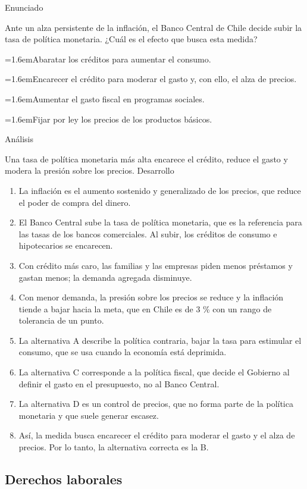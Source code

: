 \documentclass[10pt,a4paper,twocolumn]{article}
\newcommand{\alternativa}[2]{\par\noindent\hangindent=1.6em\hangafter=1\makebox[1.6em][l]{\tecla{#1}}#2\par}
\newcommand{\clave}[1]{\par\smallskip{\sffamily\footnotesize\color{esmeralda} Clave \teclaok{#1}}\par}
\begin{document}
\begin{ejemplo}
{\sffamily\footnotesize\color{zinc500} Enunciado}\par
Ante un alza persistente de la inflación, el Banco Central de Chile decide subir la tasa de política monetaria. ¿Cuál es el efecto que busca esta medida?
\alternativa{A}{Abaratar los créditos para aumentar el consumo.}
\alternativa{B}{Encarecer el crédito para moderar el gasto y, con ello, el alza de precios.}
\alternativa{C}{Aumentar el gasto fiscal en programas sociales.}
\alternativa{D}{Fijar por ley los precios de los productos básicos.}
\clave{B}
{\sffamily\footnotesize\color{zinc500} Análisis}\par Una tasa de política monetaria más alta encarece el crédito, reduce el gasto y modera la presión sobre los precios.
{\sffamily\footnotesize\color{zinc500} Desarrollo}
\begin{enumerate}
  \item La inflación es el aumento sostenido y generalizado de los precios, que reduce el poder de compra del dinero.
  \item El Banco Central sube la tasa de política monetaria, que es la referencia para las tasas de los bancos comerciales. Al subir, los créditos de consumo e hipotecarios se encarecen.
  \item Con crédito más caro, las familias y las empresas piden menos préstamos y gastan menos; la demanda agregada disminuye.
  \item Con menor demanda, la presión sobre los precios se reduce y la inflación tiende a bajar hacia la meta, que en Chile es de 3 \% con un rango de tolerancia de un punto.
  \item La alternativa A describe la política contraria, bajar la tasa para estimular el consumo, que se usa cuando la economía está deprimida.
  \item La alternativa C corresponde a la política fiscal, que decide el Gobierno al definir el gasto en el presupuesto, no al Banco Central.
  \item La alternativa D es un control de precios, que no forma parte de la política monetaria y que suele generar escasez.
  \item Así, la medida busca encarecer el crédito para moderar el gasto y el alza de precios. Por lo tanto, la alternativa correcta es la B.
\end{enumerate}
\end{ejemplo}

\subsection{Derechos laborales}
\end{document}
